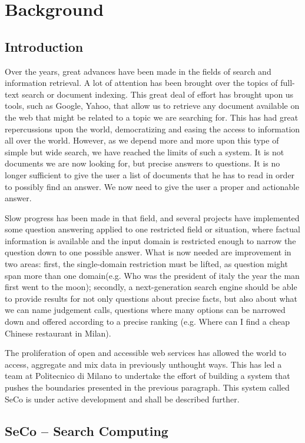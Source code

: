 \chapter{Background} %
\label{cha:background}

\section{Introduction}
Over the years, great advances have been made in the fields of search and information retrieval. A lot of attention has been brought over the topics of full-text search or document indexing. This great deal of effort has brought upon us tools, such as Google, Yahoo, that allow us to retrieve any document available on the web that might be related to a topic we are searching for. This has had great repercussions upon the world, democratizing and easing the access to information all over the world. However, as we depend more and more upon this type of simple but wide search, we have reached the limits of such a system. It is not documents we are now looking for, but precise answers to questions. It is no longer sufficient to give the user a list of documents that he has to read in order to possibly find an answer. We now need to give the user a proper and actionable answer.

Slow progress has been made in that field, and several projects have implemented some question answering applied to one restricted field or situation, where factual information is available and the input domain is restricted enough to narrow the question down to one possible answer. What is now needed are improvement in two areas: first, the single-domain restriction must be lifted, as question might span more than one domain(e.g. Who was the president of italy the year the man first went to the moon); secondly, a next-generation search engine should be able to provide results for not only questions about precise facts, but also about what we can name judgement calls, questions where many options can be narrowed down and offered according to a precise ranking (e.g. Where can I find a cheap Chinese restaurant in Milan).

The proliferation of open and accessible web services has allowed the world to access, aggregate and mix data in previously unthought ways. This has led a team at Politecnico di Milano to undertake the effort of building a system that pushes the boundaries presented in the previous paragraph. This system called SeCo is under active development and shall be described further.


\section{SeCo -- Search Computing}



